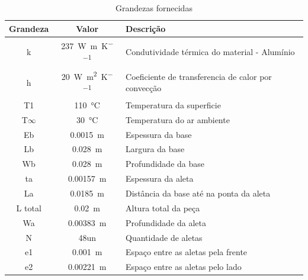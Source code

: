 \begin{table}[h]
    \ABNTEXfontereduzida
    \centering
    \caption{Grandezas fornecidas}
    \label{tab:grandezasFornecidas}
    \begin{tabular}{c c l}\toprule
        Grandeza    & Valor                                      & Descrição                                           \\
        \toprule
        k           & \SI{237}{\watt\per\meter\per\kelvin}       & Condutividade térmica do material - Alumínio        \\
        h           & \SI{20}{\watt\per\square\meter\per\kelvin} & Coeficiente de transferencia de calor por convecção \\
        T1          & \SI{110}\degreeCelsius                     & Temperatura da superficie                           \\
        T\(\infty\) & \SI{30}\degreeCelsius                      & Temperatura do ar ambiente                          \\
        Eb          & \SI{0.0015}\meter                          & Espessura da base                                   \\
        Lb          & \SI{0.028}\meter                           & Largura da base                                     \\
        Wb          & \SI{0.028}\meter                           & Profundidade da base                                \\
        ta          & \SI{0.00157}\meter                         & Espessura da aleta                                  \\
        La          & \SI{0.0185}\meter                          & Distância da base até na ponta da aleta             \\
        L total     & \SI{0.02}\meter                            & Altura total da peça                                \\
        Wa          & \SI{0.00383}\meter                         & Profundidade da aleta                               \\
        N           & 48un                                       & Quantidade de aletas                                \\
        e1          & \SI{0.001}\meter                           & Espaço entre as aletas pela frente                  \\
        e2          & \SI{0.00221}\meter                         & Espaço entre as aletas pelo lado                    \\
        \bottomrule
    \end{tabular}
    \fonteproprioautor
\end{table}